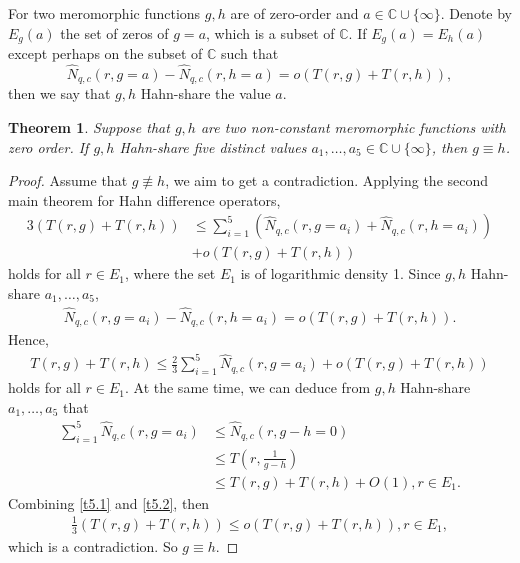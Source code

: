 \documentclass[sn-mathphys-num]{sn-jnl}%
\theoremstyle{thmstyleone}%
\newtheorem{theorem}{Theorem}%
\theoremstyle{thmstyletwo}%
\theoremstyle{thmstylethree}%
\begin{document}
\indent For two meromorphic functions $g, h$ are of zero-order and $a\in\mathbb{C}\cup\{\infty\}$. Denote by $E_{g}(a)$ the set of zeros of $g=a$, which is a subset of $\mathbb{C}$. If $E_{g}(a)=E_{h}(a)$ except perhaps on the subset of $\mathbb{C}$ such that $$\hat{N}_{q,c}(r,g=a)-\hat{N}_{q,c}(r,h=a)=o(T(r,g)+T(r,h)),$$ then we say that $g,h$ Hahn-share the value $a$.
\begin{theorem}
	Suppose that $g,h$ are two non-constant meromorphic functions with zero order. If $g,h$ Hahn-share five distinct values $a_{1},\ldots,a_{5}\in\mathbb{C}\cup\{\infty\}$, then $g\equiv h$.
\end{theorem}		
\begin{proof}
	Assume that $g\not\equiv h$, we aim to get a contradiction. Applying the second main theorem for Hahn difference operators,
	\begin{align*}
		3(T(r,g)+T(r,h))&\leq\sum_{i=1}^{5}(\hat{N}_{q,c}(r,g=a_{i})+\hat{N}_{q,c}(r,h=a_{i}))\\
		&+o(T(r,g)+T(r,h))
	\end{align*}
	holds for all $r\in E_{1}$, where the set $E_{1}$ is of logarithmic density 1.			
	Since $g,h$ Hahn-share $a_{1},\ldots,a_{5}$,
	\begin{align*}
		\hat{N}_{q,c}(r,g=a_{i})-\hat{N}_{q,c}(r,h=a_{i})=o(T(r,g)+T(r,h)).
	\end{align*}			
	Hence,
	\begin{align}\label{t5.1}
		T(r,g)+T(r,h)\leq\frac{2}{3}\sum_{i=1}^{5}\hat{N}_{q,c}(r,g=a_{i})+o(T(r,g)+T(r,h))
	\end{align}
	holds for all $r\in E_{1}$.	At the same time, we can deduce from $g,h$ Hahn-share $a_{1},\ldots,a_{5}$ that
	\begin{align}\label{t5.2}
		\sum_{i=1}^{5}\hat{N}_{q,c}(r,g=a_{i})&\leq\hat{N}_{q,c}(r,g-h=0)\\
		&\leq T\left(r,\frac{1}{g-h}\right)\nonumber\\
		&\leq T(r,g)+T(r,h)+O(1), r\in E_{1}.
	\end{align}			
	Combining \eqref{t5.1} and \eqref{t5.2}, then
	\begin{align*}
		\frac{1}{3}(T(r,g)+T(r,h))\leq o(T(r,g)+T(r,h)),  r\in E_{1},
	\end{align*}
	which is a contradiction. So $g\equiv h$.
\end{proof}		
\end{document}

